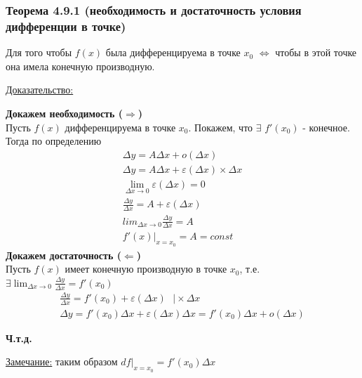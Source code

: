 \documentclass[12pt]{article}
\begin{document}
    \subsubsection*{Теорема 4.9.1 (необходимость и достаточность условия дифференции в точке)}\label{th:4.9.1}
    Для того чтобы $f(x)$ была дифференцируема в точке $x_0$ $\Longleftrightarrow$ чтобы в этой точке она имела конечную производную.\par\noindent
    \underline{Доказательство:}
    \begin{adjustwidth}{1.5em}{1.5em}
        \textbf{Докажем необходимость ($\Rightarrow$)}\\
        Пусть $f(x)$ дифференцируема в точке $x_0$. Покажем, что $\exists$ $f'(x_0)$ - конечное.\\
        Тогда по определению 
        \begin{gather*}
            \Delta y = A \Delta x+o(\Delta x)\\
            \Delta y = A \Delta x+ \varepsilon(\Delta x) \times \Delta x\\
            \lim_{\Delta x \to 0}{\varepsilon(\Delta x)}= 0\\
            \frac{\Delta y}{\Delta x}=A+\varepsilon(\Delta x)\\
            lim_{\Delta x \to 0}{\frac{\Delta y}{\Delta x}}=A\\
            f'(x)\Big|_{x=x_0}=A=const
        \end{gather*}\noindent
        \textbf{Докажем достаточность ($\Leftarrow$)}\\
        Пусть $f(x)$ имеет конечную производную в точке $x_0$, т.е. $\exists \lim_{\Delta x \to 0}{\frac{\Delta y}{\Delta x}}=f'(x_0)$\\
        \begin{gather*}
            \frac{\Delta y}{\Delta x}=f'(x_0)+\varepsilon(\Delta x)\,\,\,\,\Big| \times \Delta x\\
            \Delta y=f'(x_0)\Delta x+\varepsilon(\Delta x)\Delta x= f'(x_0)\Delta x+o(\Delta x)    
        \end{gather*}
        \begin{center}
            \textbf{Ч.т.д.}
        \end{center}    
    \end{adjustwidth}
    \underline{Замечание:} таким образом $df\Big|_{x = x_0}=f'(x_0)\Delta x$
\end{document}
